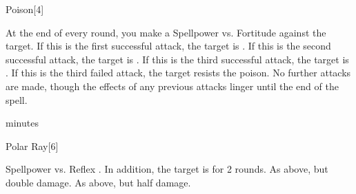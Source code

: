 \begin{spellsection}{Poison}[4]
    \begin{spellheader}
    \end{spellheader}
    \begin{spellcontent}
        \begin{spelltargetinginfo}
        \end{spelltargetinginfo}
        \begin{spelleffects}
            \begin{spellattacktriggered}{At the end of every round, you make a Spellpower vs. Fortitude against the target.}
                \spellsuccess If this is the first successful attack, the target is \sickened. If this is the second successful attack, the target is \nauseated. If this is the third successful attack, the target is \paralyzed.
                \spellfailure If this is the third failed attack, the target resists the poison. No further attacks are made, though the effects of any previous attacks linger until the end of the spell.
            \end{spellattacktriggered}
             minutes
        \end{spelleffects}
    \end{spellcontent}
    \begin{spellfooter}
        \spellnotes \physicalspellnotes
        \miscastrandom
    \end{spellfooter}
\end{spellsection}

\begin{spellsection}{Polar Ray}[6]
    \begin{spellheader}
    \end{spellheader}
    \begin{spellcontent}
        \begin{spelltargetinginfo}
        \end{spelltargetinginfo}
        \begin{spelleffects}
            \begin{spellattack}{Spellpower vs. Reflex}
                \spellsuccess {}. In addition, the target is \slowed for 2 rounds.
                \spellcritical As above, but double damage.
                \spellfailure As above, but half damage.
            \end{spellattack}
        \end{spelleffects}
    \end{spellcontent}
    \begin{spellfooter}
        \miscastrandom
    \end{spellfooter}
\end{spellsection}

